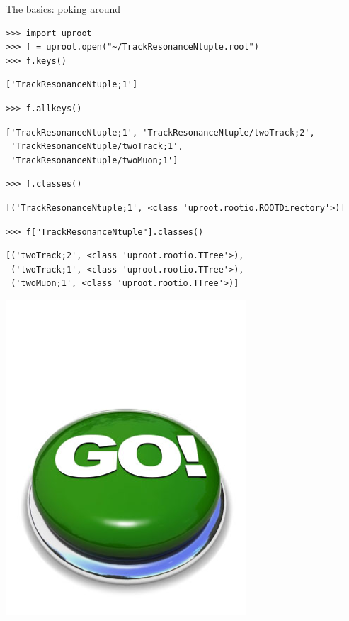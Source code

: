\documentclass[aspectratio=169]{beamer}
\begin{document}
\begin{frame}[fragile]{The basics: poking around}
\vspace{0.1 cm}
\small
\begin{verbatim}
>>> import uproot
>>> f = uproot.open("~/TrackResonanceNtuple.root")
>>> f.keys()
\end{verbatim}
\begin{verbatim}
['TrackResonanceNtuple;1']
\end{verbatim}
\begin{verbatim}
>>> f.allkeys()
\end{verbatim}
\begin{verbatim}
['TrackResonanceNtuple;1', 'TrackResonanceNtuple/twoTrack;2',
 'TrackResonanceNtuple/twoTrack;1',
 'TrackResonanceNtuple/twoMuon;1']
\end{verbatim}
\begin{verbatim}
>>> f.classes()
\end{verbatim}
\begin{verbatim}
[('TrackResonanceNtuple;1', <class 'uproot.rootio.ROOTDirectory'>)]
\end{verbatim}
\begin{verbatim}
>>> f["TrackResonanceNtuple"].classes()
\end{verbatim}
\begin{verbatim}
[('twoTrack;2', <class 'uproot.rootio.TTree'>),
 ('twoTrack;1', <class 'uproot.rootio.TTree'>),
 ('twoMuon;1', <class 'uproot.rootio.TTree'>)]
\end{verbatim}

\vspace{-7.6 cm}
\hfill \includegraphics[width=1.5 cm]{safe.png}\hspace{-0.9 cm}
\vspace{7.5 cm}
\end{frame}
\end{document}
